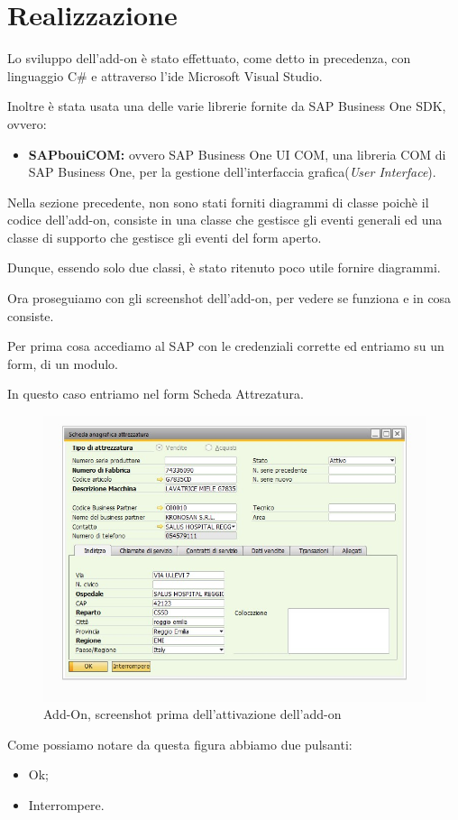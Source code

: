 \newpage

\section{Realizzazione}
\begin{flushleft}
	Lo sviluppo dell'add-on è stato effettuato, come detto in precedenza, con linguaggio C\# e attraverso l'\gls{ide} Microsoft Visual Studio.
	
	Inoltre è stata usata una delle varie librerie fornite da SAP Business One SDK, ovvero:
	\begin{itemize}
		\item \textbf{SAPbouiCOM:} ovvero SAP Business One UI COM, una libreria COM di SAP Business One, per la gestione dell'interfaccia grafica(\emph{User Interface}).
	\end{itemize}
	Nella sezione precedente, non sono stati forniti diagrammi di classe poichè il codice dell'add-on, consiste in una classe che gestisce gli eventi generali ed una classe di supporto che gestisce gli eventi del form aperto.
	
	Dunque, essendo solo due classi, è stato ritenuto poco utile fornire diagrammi.
	
	\vspace{1em}
	Ora proseguiamo con gli screenshot dell'add-on, per vedere se funziona e in cosa consiste.
\end{flushleft}
\begin{flushleft}
	Per prima cosa accediamo al SAP con le credenziali corrette ed entriamo su un form, di un modulo.
	
	In questo caso entriamo nel form Scheda Attrezatura.
	
\end{flushleft}
\begin{figure}[!h] 
	\centering 
	\includegraphics[scale = 0.6]{immagini/add-on/addon-scheda-nobutton.jpg} 
	\caption{Add-On, screenshot prima dell'attivazione dell'add-on}
\end{figure}
Come possiamo notare da questa figura abbiamo due pulsanti:
\begin{itemize}
	\item Ok;
	\item Interrompere.
\end{itemize}

